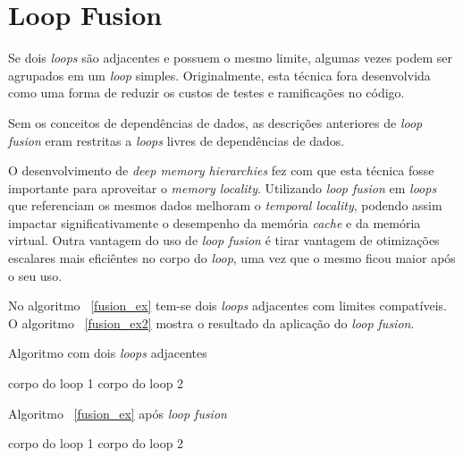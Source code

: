 
\section{Loop Fusion}

Se dois \textit{loops} são adjacentes e possuem o mesmo limite, algumas vezes
podem ser agrupados em um \textit{loop} simples.
Originalmente, esta técnica fora desenvolvida como uma forma de reduzir os
custos de testes e ramificações no código.

Sem os conceitos de dependências de dados, as descrições anteriores de
\textit{loop fusion} eram restritas a \textit{loops} livres de dependências de
dados. 

O desenvolvimento de \textit{deep memory hierarchies} fez com que esta técnica
fosse importante para aproveitar o \textit{memory locality}.
Utilizando \textit{loop fusion} em \textit{loops} que referenciam os mesmos
dados melhoram o \textit{temporal locality}, podendo assim impactar 
significativamente o desempenho da memória \textit{cache} e da memória virtual.
Outra vantagem do uso de \textit{loop fusion} é tirar vantagem de otimizações 
escalares mais eficiêntes no corpo do \textit{loop}, uma vez que o mesmo ficou
maior após o seu uso.

No algoritmo ~\ref{fusion_ex} tem-se dois \textit{loops} adjacentes com limites
compatíveis. 
O algoritmo ~\ref{fusion_ex2} mostra o resultado da aplicação do 
\textit{loop fusion}.

\begin{algorithm}
\caption{Algoritmo com dois \textit{loops} adjacentes}
\label{fusion_ex}
\begin{algorithmic}[1]

\STATE corpo do loop 1
\ENDFOR
{}
\STATE corpo do loop 2
\ENDFOR

\end{algorithmic}
\end{algorithm}

\begin{algorithm}
\caption{Algoritmo ~\ref{fusion_ex} após \textit{loop fusion}}
\label{fusion_ex2}
\begin{algorithmic}[1]

\STATE corpo do loop 1
\STATE corpo do loop 2
\ENDFOR

\end{algorithmic}
\end{algorithm}

